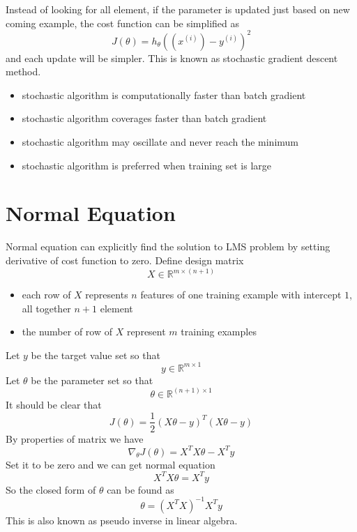 \documentclass[10pt,a4paper,oneside]{article}
\begin{document}
Instead of looking for all element, if the parameter is updated just based on new coming example, the cost function can be simplified as
\[
J(\theta) = h_\theta((x^{(i)}) - y^{(i)})^2
\]
and each update will be simpler. This is known as stochastic gradient descent method.
\begin{itemize}
	\item stochastic algorithm is computationally faster than batch gradient
	\item stochastic algorithm coverages faster than batch gradient
	\item stochastic algorithm may oscillate and never reach the minimum
	\item stochastic algorithm is preferred when training set is large 
\end{itemize}

\section{Normal Equation}
Normal equation can explicitly find the solution to LMS problem by setting derivative of cost function to zero. Define design matrix 
\[
X \in \mathbb{R}^{m \times (n+1)}
\]
\begin{itemize}
	\item each row of $X$ represents $n$ features of one training example with intercept $1$, all together $n+1$ element
	\item the number of row of $X$ represent $m$ training examples
\end{itemize}
Let $y$ be the target value set so that 
\[
y \in \mathbb{R}^{m \times 1}
\]
Let $\theta$ be the parameter set so that
\[
\theta \in \mathbb{R}^{(n+1) \times 1}
\]
It should be clear that
\[
J(\theta) = \frac{1}{2}(X\theta-y)^T (X\theta-y)
\]
By properties of matrix we have
\[
\nabla _\theta J(\theta) = X^T X\theta - X^T y
\]
Set it to be zero and we can get normal equation
\[
X^T X\theta = X^T y
\]
So the closed form of $\theta$ can be found as
\[
\theta = (X^T X)^{-1} X^T y
\]
This is also known as pseudo inverse in linear algebra.
\end{document}
